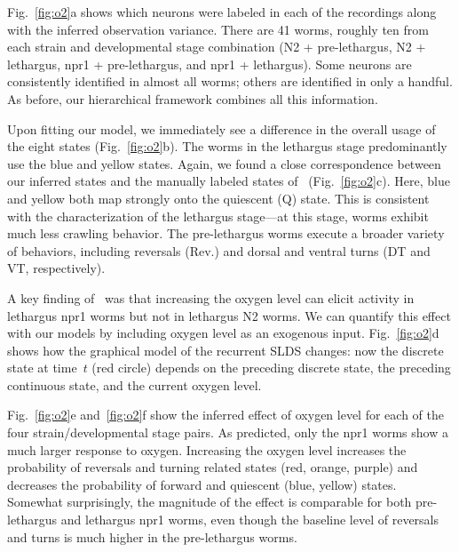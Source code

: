 \documentclass[11pt]{article}
\begin{document}
Fig.~\ref{fig:o2}a shows which neurons were labeled in each of the
recordings along with the inferred observation variance. There are 41
worms, roughly ten from each strain and developmental stage
combination (N2 + pre-lethargus, N2 + lethargus, npr1 + pre-lethargus,
and npr1 + lethargus). Some neurons are consistently identified in
almost all worms; others are identified in only a handful.  As before,
our hierarchical framework combines all this information.

Upon fitting our model, we immediately see a difference in the overall
usage of the eight states (Fig.~\ref{fig:o2}b). The worms in the
lethargus stage predominantly use the blue and yellow states.  Again,
we found a close correspondence between our inferred states and the
manually labeled states of~\citet{nichols2017global}
(Fig.~\ref{fig:o2}c). Here, blue and yellow both map strongly onto the
quiescent (\textsf{Q}) state. This is consistent with the
characterization of the lethargus stage---at this stage, worms exhibit
much less crawling behavior. The pre-lethargus worms execute a broader
variety of behaviors, including reversals (\textsf{Rev.}) and dorsal
and ventral turns  (\textsf{DT} and \textsf{VT}, respectively). 

A key finding of~\citet{nichols2017global} was that increasing the
oxygen level can elicit activity in lethargus npr1 worms but not in
lethargus N2 worms. We can quantify this effect with our models by
including oxygen level as an exogenous input.  Fig.~\ref{fig:o2}d
shows how the graphical model of the recurrent SLDS changes: now the
discrete state at time~$t$ (red circle) depends on the preceding discrete
state, the preceding continuous state, and the current oxygen level.

Fig.~\ref{fig:o2}e and~\ref{fig:o2}f show the inferred effect of
oxygen level for each of the four strain/developmental stage pairs.
As predicted, only the npr1 worms show a much larger response to
oxygen. Increasing the oxygen level increases the probability
of reversals and turning related states (red, orange, purple) and
decreases the probability of forward and quiescent (blue, yellow)
states. Somewhat surprisingly, the magnitude of the effect is
comparable for both pre-lethargus and lethargus npr1 worms, even
though the baseline level of reversals and turns is much higher in
the pre-lethargus worms. 

\clearpage
\end{document}
